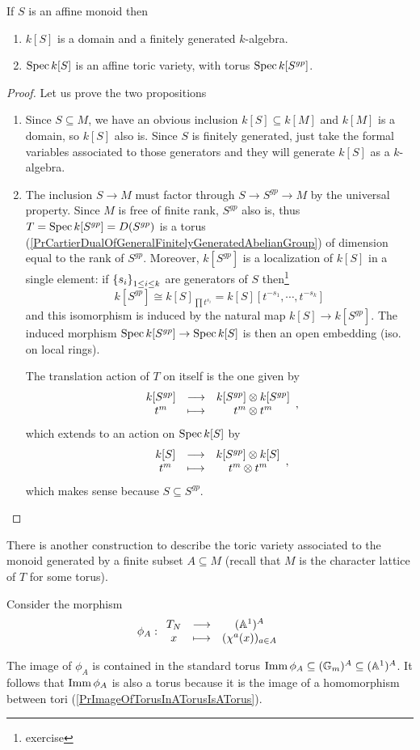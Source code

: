\begin{proposition}[]\label{PrToricVarietyAssociatedToAffineMonoid}
If $S$ is an affine monoid then
\begin{enumerate}
\item $k[S]$ is a domain and a finitely generated $k$-algebra.
\item $\operatorname{Spec} k[S]$ is an affine toric variety, with torus $\operatorname{Spec} k[S^{gp}]$.
\end{enumerate}
\end{proposition}
\begin{proof}
Let us prove the two propositions
\setlength{\leftmargini}{0cm}
\begin{enumerate}
\item Since $S\subseteq M$, we have an obvious inclusion $k[S]\subseteq k[M]$ and $k[M]$ is a domain, so $k[S]$ also is. Since $S$ is finitely generated, just take the formal variables associated to those generators and they will generate $k[S]$ as a $k$-algebra.
\item The inclusion $S\to M$ must factor through $S\to S^{gp}\to M$ by the universal property. Since $M$ is free of finite rank, $S^{gp}$ also is, thus $T=\operatorname{Spec} k[S^{gp}]=D(S^{gp})$ is a torus (\ref{PrCartierDualOfGeneralFinitelyGeneratedAbelianGroup}) of dimension equal to the rank of $S^{gp}$. Moreover, $k[S^{gp}]$ is a localization of $k[S]$ in a single element: if $\left\{{s_i}\right\}_{1\leq i\leq k}$ are generators of $S$ then\footnote{exercise}
\[k[S^{gp}]\cong k[S]_{\prod t^{s_i}}=k[S][t^{-s_1},\cdots,t^{-s_k}]\]
and this isomorphism is induced by the natural map $k[S]\to k[S^{gp}]$. The induced morphism $\operatorname{Spec} k[S^{gp}]\to \operatorname{Spec} k[S]$ is then an open embedding (iso. on local rings).

The translation action of $T$ on itself is the one given by
\[\begin{array}{ccc} {k[S^{gp}]} & \longrightarrow & {k[S^{gp}]\otimes k[S^{gp}]}\\ {t^m} & \longmapsto & {t^m\otimes t^m} \end{array},\]
which extends to an action on $\operatorname{Spec} k[S]$ by
\[\begin{array}{ccc} {k[S]} & \longrightarrow & {k[S^{gp}]\otimes k[S]}\\ {t^m} & \longmapsto & {t^m\otimes t^m} \end{array},\]
which makes sense because $S\subseteq S^{gp}$.
\end{enumerate}
\setlength{\leftmargini}{0.5cm}
\end{proof}

There is another construction to describe the toric variety associated to the monoid generated by a finite subset $A\subseteq M$ (recall that $M$ is the character lattice of $T$ for some torus).


Consider the morphism 
\[\phi_A:\begin{array}{ccc} {T_N} & \longrightarrow & {(\mathbb{A}^1)^A}\\ {x} & \longmapsto & {(\chi^a(x))_{a\in A}} \end{array}\]
\begin{remark}
The image of $\phi_A$ is contained in the standard torus $\operatorname{Imm} \phi_A\subseteq (\mathbb{G}_m)^A\subseteq (\mathbb{A}^1)^A$. It follows that $\operatorname{Imm} \phi_A$ is also a torus because it is the image of a homomorphism between tori (\ref{PrImageOfTorusInATorusIsATorus}).
\end{remark}

